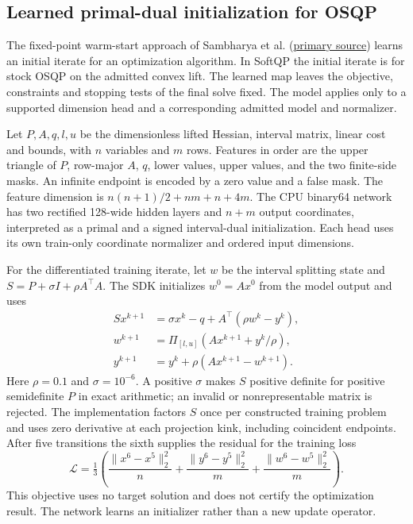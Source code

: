 \subsection{Learned primal-dual initialization for OSQP}\label{sec:method-learned-osqp}
The fixed-point warm-start approach of Sambharya et al.
(\href{https://www.jmlr.org/papers/volume25/23-1174/23-1174.pdf}{primary source})
learns an initial iterate for an optimization algorithm. In SoftQP the
initial iterate is for stock OSQP \cite{osqp} on the admitted convex lift.
The learned map leaves the objective, constraints and stopping tests
of the final solve fixed. The model applies only to a supported
dimension head and a corresponding admitted model and normalizer.

Let \(P,A,q,l,u\) be the dimensionless lifted Hessian, interval matrix,
linear cost and bounds, with \(n\) variables and \(m\) rows. Features in
order are the upper triangle of \(P\), row-major \(A\), \(q\), lower
values, upper values, and the two finite-side masks. An infinite
endpoint is encoded by a zero value and a false mask. The feature
dimension is \(n(n+1)/2+nm+n+4m\). The CPU binary64 network has
two rectified 128-wide hidden layers and \(n+m\) output coordinates,
interpreted as a primal and a signed interval-dual initialization.
Each head uses its own train-only coordinate normalizer and ordered
input dimensions.

For the differentiated training iterate, let \(w\) be the interval
splitting state and \(S=P+\sigma I+\rho A^\top A\).
The SDK initializes \(w^0=Ax^0\) from the model output and uses
\begin{align}
 S x^{k+1}&=\sigma x^k-q+A^\top(\rho w^k-y^k),\label{eq:learn-osqp-x}\\
 w^{k+1}&=\Pi_{[l,u]}(Ax^{k+1}+y^k/\rho),\label{eq:learn-osqp-w}\\
 y^{k+1}&=y^k+\rho(Ax^{k+1}-w^{k+1}).\label{eq:learn-osqp-y}
\end{align}
Here \(\rho=0.1\) and \(\sigma=10^{-6}\). A positive \(\sigma\) makes
\(S\) positive definite for positive semidefinite \(P\) in exact
arithmetic; an invalid or nonrepresentable matrix is rejected.
The implementation factors \(S\) once per constructed training
problem and uses zero derivative at each projection kink, including
coincident endpoints. After five transitions the sixth supplies
the residual for the training loss
\begin{equation}\label{eq:learn-osqp-loss}
 \mathcal L=\tfrac13\left(
 \frac{\lVert x^6-x^5\rVert_2^2}{n}
 +\frac{\lVert y^6-y^5\rVert_2^2}{m}
 +\frac{\lVert w^6-w^5\rVert_2^2}{m}\right).
\end{equation}
This objective uses no target solution and does not certify the
optimization result. The network learns an initializer rather than
a new update operator.

